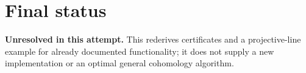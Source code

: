 \documentclass[11pt]{article}
\begin{document}
\section{Final status}
\textbf{Unresolved in this attempt.} This rederives certificates and a projective-line example for already documented functionality; it does not supply a new implementation or an optimal general cohomology algorithm.
\end{document}
